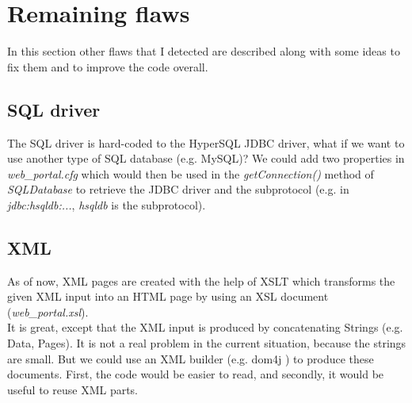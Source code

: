 \section{Remaining flaws}

In this section other flaws that I detected are described along with some ideas
to fix them and to improve the code overall.

\subsection*{SQL driver}

The SQL driver is hard-coded to the HyperSQL JDBC driver, what if we want to use
another type of SQL database (e.g. MySQL)? We could add two properties in
\emph{web\_portal.cfg} which would then be used in the \emph{getConnection()}
method of \emph{SQLDatabase} to retrieve the JDBC driver and the subprotocol
(e.g. in \emph{jdbc:hsqldb:...}, \emph{hsqldb} is the subprotocol).

\subsection*{XML}
As of now, XML pages are created with the help of XSLT which transforms the
given XML input into an HTML page by using an XSL document
(\emph{web\_portal.xsl}).\\

It is great, except that the XML input is produced by concatenating Strings
(e.g. Data, Pages). It is not a real problem in the current situation, because
the strings are small.
But we could use an XML builder (e.g. dom4j \cite{cite:dom4j}) to produce these
documents. First, the code would be easier to read, and secondly, it would be
useful to reuse XML parts.

\newpage

